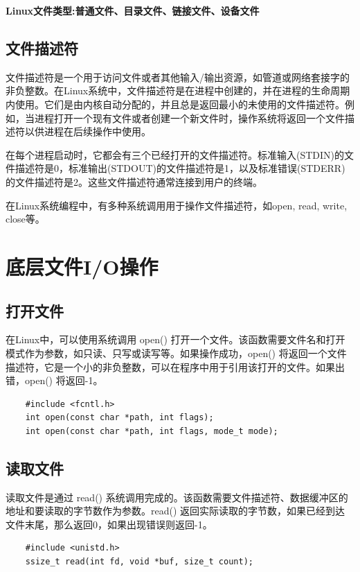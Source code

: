 \documentclass[12pt, a4paper, oneside]{ctexbook}
\numberwithin{figure}{section}
\begin{document}
\textbf{Linux文件类型:普通文件、目录文件、链接文件、设备文件}

\subsection{文件描述符}

文件描述符是一个用于访问文件或者其他输入/输出资源，如管道或网络套接字的非负整数。在Linux系统中，文件描述符是在进程中创建的，并在进程的生命周期内使用。它们是由内核自动分配的，并且总是返回最小的未使用的文件描述符。例如，当进程打开一个现有文件或者创建一个新文件时，操作系统将返回一个文件描述符以供进程在后续操作中使用。

在每个进程启动时，它都会有三个已经打开的文件描述符。标准输入(STDIN)的文件描述符是0，标准输出(STDOUT)的文件描述符是1，以及标准错误(STDERR)的文件描述符是2。这些文件描述符通常连接到用户的终端。

在Linux系统编程中，有多种系统调用用于操作文件描述符，如open, read, write, close等。

\section{底层文件I/O操作}

\subsection{打开文件}

在Linux中，可以使用系统调用 open() 打开一个文件。该函数需要文件名和打开模式作为参数，如只读、只写或读写等。如果操作成功，open() 将返回一个文件描述符，它是一个小的非负整数，可以在程序中用于引用该打开的文件。如果出错，open() 将返回-1。

\begin{verbatim}
    #include <fcntl.h>
    int open(const char *path, int flags);
    int open(const char *path, int flags, mode_t mode);
\end{verbatim}

\subsection{读取文件}

读取文件是通过 read() 系统调用完成的。该函数需要文件描述符、数据缓冲区的地址和要读取的字节数作为参数。read() 返回实际读取的字节数，如果已经到达文件末尾，那么返回0，如果出现错误则返回-1。

\begin{verbatim}
    #include <unistd.h>
    ssize_t read(int fd, void *buf, size_t count);
\end{verbatim}
\end{document}

